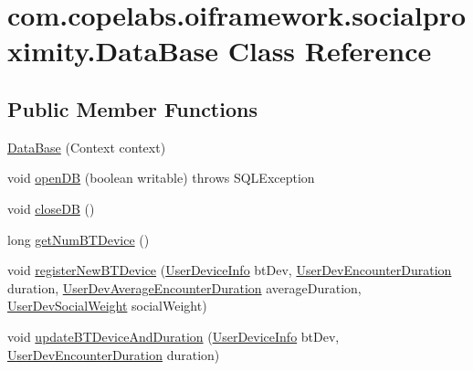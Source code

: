 \hypertarget{classcom_1_1copelabs_1_1oiframework_1_1socialproximity_1_1_data_base}{}\section{com.\+copelabs.\+oiframework.\+socialproximity.\+Data\+Base Class Reference}
\label{classcom_1_1copelabs_1_1oiframework_1_1socialproximity_1_1_data_base}
\subsection*{Public Member Functions}
\begin{DoxyCompactItemize}
\item 
\hyperlink{classcom_1_1copelabs_1_1oiframework_1_1socialproximity_1_1_data_base_acfeb9c0f6f87ba6b9348a450f29d3356}{Data\+Base} (Context context)
\item 
void \hyperlink{classcom_1_1copelabs_1_1oiframework_1_1socialproximity_1_1_data_base_a23cc0dd4495681c16e4298031f135ca3}{open\+D\+B} (boolean writable)  throws S\+Q\+L\+Exception 
\item 
void \hyperlink{classcom_1_1copelabs_1_1oiframework_1_1socialproximity_1_1_data_base_a824c3640cd1c82dc2117b9b10c12c995}{close\+D\+B} ()
\item 
long \hyperlink{classcom_1_1copelabs_1_1oiframework_1_1socialproximity_1_1_data_base_ac68ad2a94714b0eec8e17528b2daf216}{get\+Num\+B\+T\+Device} ()
\item 
void \hyperlink{classcom_1_1copelabs_1_1oiframework_1_1socialproximity_1_1_data_base_a4853f809ad8d1dc07f451cc12ac026ef}{register\+New\+B\+T\+Device} (\hyperlink{classcom_1_1copelabs_1_1oiframework_1_1socialproximity_1_1_user_device_info}{User\+Device\+Info} bt\+Dev, \hyperlink{classcom_1_1copelabs_1_1oiframework_1_1socialproximity_1_1_user_dev_encounter_duration}{User\+Dev\+Encounter\+Duration} duration, \hyperlink{classcom_1_1copelabs_1_1oiframework_1_1socialproximity_1_1_user_dev_average_encounter_duration}{User\+Dev\+Average\+Encounter\+Duration} average\+Duration, \hyperlink{classcom_1_1copelabs_1_1oiframework_1_1socialproximity_1_1_user_dev_social_weight}{User\+Dev\+Social\+Weight} social\+Weight)
\item 
void \hyperlink{classcom_1_1copelabs_1_1oiframework_1_1socialproximity_1_1_data_base_aa1056c80c379ad4418524b2370de3f82}{update\+B\+T\+Device\+And\+Duration} (\hyperlink{classcom_1_1copelabs_1_1oiframework_1_1socialproximity_1_1_user_device_info}{User\+Device\+Info} bt\+Dev, \hyperlink{classcom_1_1copelabs_1_1oiframework_1_1socialproximity_1_1_user_dev_encounter_duration}{User\+Dev\+Encounter\+Duration} duration)

\end{DoxyCompactItemize}
